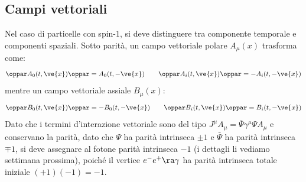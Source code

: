 \subsection{Campi vettoriali}

Nel caso di particelle con spin-$ 1 $, si deve distinguere tra componente temporale e componenti spaziali. Sotto parità, un campo vettoriale polare $ A_\mu(x) $ trasforma come:
\begin{equation*}
  \oppar A_0(t,\ve{x}) \oppar = A_0(t,-\ve{x})
  \qquad
  \oppar A_i(t,\ve{x}) \oppar = - A_i(t,-\ve{x})
\end{equation*}
mentre un campo vettoriale assiale $ B_\mu(x) $:
\begin{equation*}
  \oppar B_0(t,\ve{x}) \oppar = - B_0(t,-\ve{x})
  \qquad
  \oppar B_i(t,\ve{x}) \oppar = B_i(t,-\ve{x})
\end{equation*}
Dato che i termini d'interazione vettoriale sono del tipo $ J^\mu A_\mu = \bar{\Psi} \gamma^\mu \Psi A_\mu $ e conservano la parità, dato che $ \Psi $ ha parità intrinseca $ \pm 1 $ e $ \bar{\Psi} $ ha parità intrinseca $ \mp 1 $, si deve assegnare al fotone parità intrinseca $ -1 $ (i dettagli li vediamo settimana prossima), poiché il vertice $ e^-e^+ \ra \gamma $ ha parità intrinseca totale iniziale $ (+1)(-1) = -1 $.











